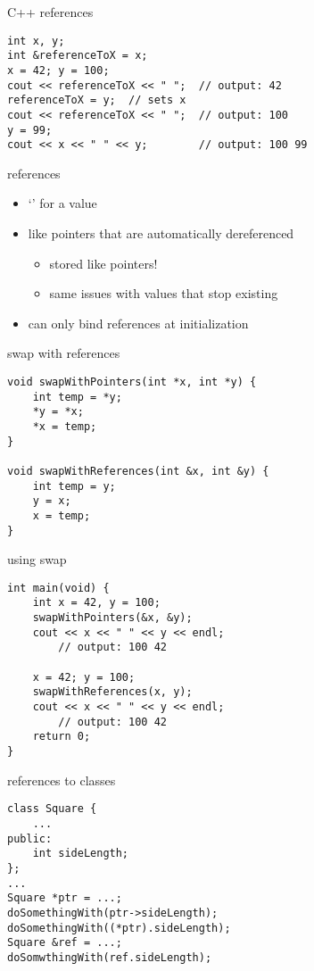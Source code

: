 \begin{frame}[fragile,label=cppReferences]{C++ references}
\lstset{
    language=C++,
    style=small
}
\begin{lstlisting}
int x, y;
int &referenceToX = x;
x = 42; y = 100;
cout << referenceToX << " ";  // output: 42
referenceToX = y;  // sets x
cout << referenceToX << " ";  // output: 100
y = 99;
cout << x << " " << y;        // output: 100 99
\end{lstlisting}
\end{frame}

\begin{frame}{references}
    \begin{itemize}
    \item `' for a value
    \item like pointers that are automatically dereferenced
        \begin{itemize}
        \item stored like pointers!
        \item same issues with values that stop existing 
        \end{itemize}
    \item can only bind references at initialization
    \end{itemize}
\end{frame}

\begin{frame}[fragile,label=swapRef]{swap with references}
\lstset{
    language=C++,
    style=small
}
\begin{lstlisting}
void swapWithPointers(int *x, int *y) {
    int temp = *y;
    *y = *x;
    *x = temp;
}

void swapWithReferences(int &x, int &y) {
    int temp = y;
    y = x;
    x = temp;
}
\end{lstlisting}
\end{frame}

\begin{frame}[fragile,label=usingSwap]{using swap}
\lstset{
    language=C++,
    style=small
}
\begin{lstlisting}
int main(void) {
    int x = 42, y = 100;
    swapWithPointers(&x, &y);
    cout << x << " " << y << endl; 
        // output: 100 42

    x = 42; y = 100;
    swapWithReferences(x, y);
    cout << x << " " << y << endl; 
        // output: 100 42
    return 0;
}
\end{lstlisting}
\end{frame}

\begin{frame}[fragile,label=refToClass]{references to classes}
\begin{lstlisting}
class Square {
    ...
public:
    int sideLength;
};
...
Square *ptr = ...;
doSomethingWith(ptr->sideLength);
doSomethingWith((*ptr).sideLength);
Square &ref = ...;
doSomwthingWith(ref.sideLength);
\end{lstlisting}
\end{frame}
